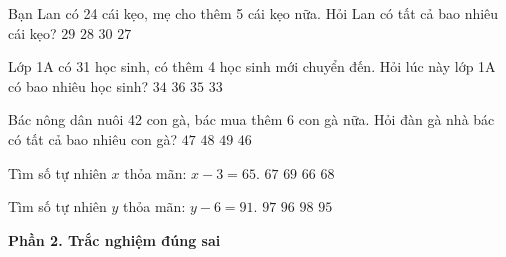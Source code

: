 \begin{ex} %
Bạn Lan có 24 cái kẹo, mẹ cho thêm 5 cái kẹo nữa. Hỏi Lan có tất cả bao nhiêu cái kẹo?
\choice
{\True $29$}
{$28$}
{$30$}
{$27$}
\end{ex}

\begin{ex} %
Lớp 1A có 31 học sinh, có thêm 4 học sinh mới chuyển đến. Hỏi lúc này lớp 1A có bao nhiêu học sinh?
\choice
{$34$}
{$36$}
{\True $35$}
{$33$}
\end{ex}

\begin{ex} %
Bác nông dân nuôi 42 con gà, bác mua thêm 6 con gà nữa. Hỏi đàn gà nhà bác có tất cả bao nhiêu con gà?
\choice
{$47$}
{\True $48$}
{$49$}
{$46$}
\end{ex}

\begin{ex} %
Tìm số tự nhiên $x$ thỏa mãn: $x - 3 = 65$.
\choice
{$67$}
{$69$}
{$66$}
{\True $68$}
\end{ex}

\begin{ex} %
Tìm số tự nhiên $y$ thỏa mãn: $y - 6 = 91$.
\choice
{\True $97$}
{$96$}
{$98$}
{$95$}
\end{ex}

\textbf{Phần 2. Trắc nghiệm đúng sai}

